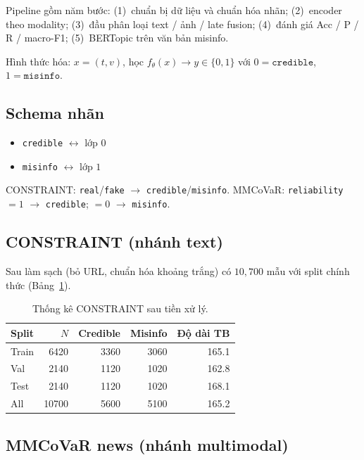 \documentclass[12pt, a4paper]{report}
\begin{document}
Pipeline gồm năm bước: (1)~chuẩn bị dữ liệu và chuẩn hóa nhãn;
(2)~encoder theo modality;
(3)~đầu phân loại text / ảnh / late fusion;
(4)~đánh giá Acc / P / R / macro-F1;
(5)~BERTopic trên văn bản misinfo.

Hình thức hóa: \(x=(t,v)\), học \(f_\theta(x)\rightarrow y\in\{0,1\}\) với \(0=\texttt{credible}\), \(1=\texttt{misinfo}\).

\subsection{Schema nhãn}

\begin{itemize}
  \item \texttt{credible} \(\leftrightarrow\) lớp \(0\)
  \item \texttt{misinfo} \(\leftrightarrow\) lớp \(1\)
\end{itemize}
CONSTRAINT: \texttt{real}/\texttt{fake} \(\rightarrow\) \texttt{credible}/\texttt{misinfo}.
MMCoVaR: \texttt{reliability}$=1$ \(\rightarrow\) \texttt{credible}; \(=0\) \(\rightarrow\) \texttt{misinfo}.

\subsection{CONSTRAINT (nhánh text)}

Sau làm sạch (bỏ URL, chuẩn hóa khoảng trắng) có $10{,}700$ mẫu với split chính thức (Bảng~\ref{tab:constraint-stats}).

\begin{table}[htbp]
\centering
\caption{Thống kê CONSTRAINT sau tiền xử lý.}
\label{tab:constraint-stats}
\begin{tabular}{lrrrr}
\hline
Split & $N$ & Credible & Misinfo & Độ dài TB \\
\hline
Train & 6420 & 3360 & 3060 & 165.1 \\
Val   & 2140 & 1120 & 1020 & 162.8 \\
Test  & 2140 & 1120 & 1020 & 168.1 \\
\hline
All   & 10700 & 5600 & 5100 & 165.2 \\
\hline
\end{tabular}
\end{table}

\subsection{MMCoVaR news (nhánh multimodal)}
\end{document}
